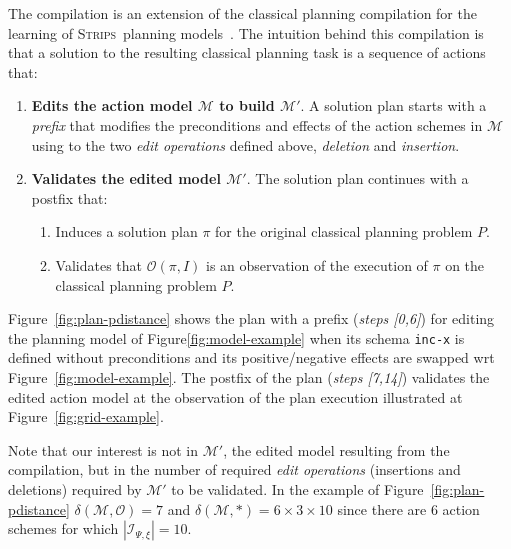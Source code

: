 \documentclass[letterpaper]{article} %
\newcommand{\strips}{\textsc{Strips}}     %
\begin{document}
The compilation is an extension of the classical planning compilation for the learning of \strips\ planning models~\cite{aineto2018learning}. The intuition behind this compilation is that a solution to the resulting classical planning task is a sequence of actions that:
\begin{enumerate}
\item {\bf Edits the action model $\mathcal{M}$ to build $\mathcal{M}'$}. A solution plan starts with a {\em prefix} that modifies the preconditions and effects of the action schemes in $\mathcal{M}$ using to the two {\em edit operations} defined above, {\em deletion} and {\em insertion}. 
\item {\bf Validates the edited model $\mathcal{M}'$}. The solution plan continues with a postfix that:
\begin{enumerate}
\item Induces a solution plan $\pi$ for the original classical planning problem $P$.
\item Validates that $\mathcal{O}(\pi,I)$ is an observation of the execution of $\pi$ on the classical planning problem $P$.
\end{enumerate}
\end{enumerate}

Figure~\ref{fig:plan-pdistance} shows the plan with a prefix ({\em steps [0,6]}) for editing the planning model of Figure\ref{fig:model-example} when its schema {\tt\small inc-x} is defined without preconditions and its positive/negative effects are swapped wrt Figure~\ref{fig:model-example}. The postfix of the plan ({\em steps [7,14]}) validates the edited action model at the observation of the plan execution illustrated at Figure~\ref{fig:grid-example}. 

Note that our interest is not in $\mathcal{M}'$, the edited model resulting from the compilation, but in the number of required {\em edit operations} (insertions and deletions) required by $\mathcal{M}'$ to be validated. In the example of Figure~\ref{fig:plan-pdistance} $\delta(\mathcal{M},\mathcal{O})=7$ and $\delta(\mathcal{M},*)=6\times 3\times 10$ since there are 6 action schemes for which $|{\mathcal I}_{\Psi,\xi}|=10$.
\end{document}
